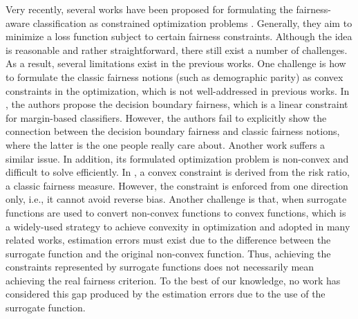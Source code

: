 \documentclass[letterpaper]{article} %
\begin{document}
Very recently, several works have been proposed for formulating the fairness-aware classification as constrained optimization problems \cite{Goh,Zafar2017b,Zafar2017a}. Generally, they aim to minimize a loss function subject to certain fairness constraints. Although the idea is reasonable and rather straightforward, there still exist a number of challenges. As a result, several limitations exist in the previous works. One challenge is how to formulate the classic fairness notions (such as demographic parity) as convex constraints in the optimization, which is not well-addressed in previous works. In \cite{Zafar2017a}, the authors propose the decision boundary fairness, which is a linear constraint for margin-based classifiers. However, the authors fail to explicitly show the connection between the decision boundary fairness and classic fairness notions, where the latter is the one people really care about. Another work \cite{Zafar2017b} suffers a similar issue. In addition, its formulated optimization problem is non-convex and difficult to solve efficiently. In \cite{Goh}, a convex constraint is derived from the risk ratio, a classic fairness measure. However, the constraint is enforced from one direction only, i.e., it cannot avoid reverse bias. Another challenge is that, when surrogate functions are used to convert non-convex functions to convex functions, which is a widely-used strategy to achieve convexity in optimization and adopted in many related works, estimation errors must exist due to the difference between the surrogate function and the original non-convex function. Thus, achieving the constraints represented by surrogate functions does not necessarily mean achieving the real fairness criterion. To the best of our knowledge, no work has considered this gap produced by the estimation errors due to the use of the surrogate function.
\end{document}
